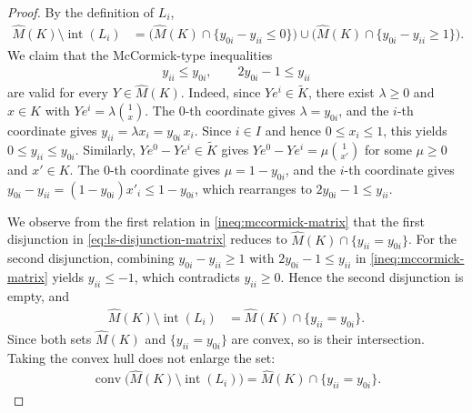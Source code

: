 \documentclass[10pt,a4paper]{amsart}
\begin{document}
\begin{proof}
    By the definition of $L_i$,
    \begin{align}
        \hat M(K) \setminus \operatorname{int}(L_i)
        &= \bigl(\hat M(K) \cap \{y_{0i} - y_{ii} \leq 0\}\bigr)
        \cup \bigl(\hat M(K) \cap \{y_{0i} - y_{ii} \geq 1\}\bigr). \label{eq:ls-disjunction-matrix}
    \end{align}
    We claim that the McCormick-type inequalities
    \begin{align}
        y_{ii} \leq y_{0i}, \qquad 2y_{0i} - 1 \leq y_{ii} \label{ineq:mccormick-matrix}
    \end{align}
    are valid for every $Y \in \hat M(K)$. Indeed, since $Ye^i \in \tilde K$, there exist $\lambda \geq 0$ and $x \in K$ with $Ye^i = \lambda \binom{1}{x}$. The $0$-th coordinate gives $\lambda = y_{0i}$, and the $i$-th coordinate gives $y_{ii} = \lambda x_i = y_{0i}\, x_i$. Since $i \in I$ and hence $0 \leq x_i \leq 1$, this yields $0 \leq y_{ii} \leq y_{0i}$. Similarly, $Ye^0 - Ye^i \in \tilde K$ gives $Ye^0 - Ye^i = \mu\binom{1}{x'}$ for some $\mu \geq 0$ and $x' \in K$. The $0$-th coordinate gives $\mu = 1 - y_{0i}$, and the $i$-th coordinate gives $y_{0i} - y_{ii} = (1-y_{0i})x'_i \leq 1 - y_{0i}$, which rearranges to $2y_{0i} - 1 \leq y_{ii}$.

    We observe from the first relation in \eqref{ineq:mccormick-matrix} that the first disjunction in \eqref{eq:ls-disjunction-matrix} reduces to $\hat M(K) \cap \{y_{ii} = y_{0i}\}$.
    For the second disjunction, combining $y_{0i} - y_{ii} \geq 1$ with $2y_{0i} - 1 \leq y_{ii}$ in \eqref{ineq:mccormick-matrix} yields $y_{ii} \leq -1$,
    which contradicts $y_{ii} \geq 0$. Hence the second disjunction is empty, and
    \begin{align}
        \hat M(K) \setminus \operatorname{int}(L_i) &= \hat M(K) \cap \{y_{ii} = y_{0i}\}.
    \end{align}
    Since both sets $\hat M(K)$ and $\{y_{ii} = y_{0i}\}$ are convex, so is their intersection. Taking the convex hull does not enlarge the set:
    \begin{align}
        \operatorname{conv}\bigl(\hat M(K) \setminus \operatorname{int}(L_i)\bigr) = \hat M(K) \cap \{y_{ii} = y_{0i}\}.
    \end{align}
\end{proof}
\end{document}
